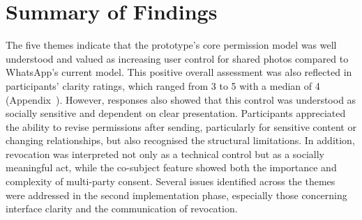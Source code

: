 \section {Summary of Findings}
The five themes indicate that the prototype's core permission model was well understood and valued as increasing user control for shared photos compared to WhatsApp's current model. This positive overall assessment was also reflected in participants' clarity ratings, which ranged from 3 to 5 with a median of 4 (Appendix~). However, responses also showed that this control was understood as socially sensitive and dependent on clear presentation. Participants appreciated the ability to revise permissions after sending, particularly for sensitive content or changing relationships, but also recognised the structural limitations. In addition, revocation was interpreted not only as a technical control but as a socially meaningful act, while the co-subject feature showed both the importance and complexity of multi-party consent. Several issues identified across the themes were addressed in the second implementation phase, especially those concerning interface clarity and the communication of revocation.


















